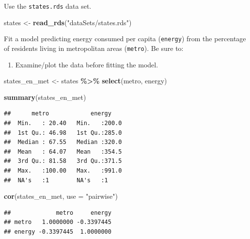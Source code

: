 \documentclass[
]{book}
\newenvironment{Shaded}{\begin{snugshade}}{\end{snugshade}}
\newcommand{\DataTypeTok}[1]{\textcolor[rgb]{0.13,0.29,0.53}{#1}}
\newcommand{\KeywordTok}[1]{\textcolor[rgb]{0.13,0.29,0.53}{\textbf{#1}}}
\newcommand{\NormalTok}[1]{#1}
\newcommand{\OperatorTok}[1]{\textcolor[rgb]{0.81,0.36,0.00}{\textbf{#1}}}
\newcommand{\StringTok}[1]{\textcolor[rgb]{0.31,0.60,0.02}{#1}}
\providecommand{\tightlist}{%
  \setlength{\itemsep}{0pt}\setlength{\parskip}{0pt}}
\begin{document}
\begin{alert}

Use the \texttt{states.rds} data set.

\begin{Shaded}
\begin{Highlighting}[]
\NormalTok{  states \textless{}{-}}\StringTok{ }\KeywordTok{read\_rds}\NormalTok{(}\StringTok{"dataSets/states.rds"}\NormalTok{)}
\end{Highlighting}
\end{Shaded}

Fit a model predicting energy consumed per capita (\texttt{energy}) from the percentage of residents living in metropolitan areas (\texttt{metro}). Be sure to:

\begin{enumerate}
\def\labelenumi{\arabic{enumi}.}
\tightlist
\item
  Examine/plot the data before fitting the model.
\end{enumerate}

\begin{Shaded}
\begin{Highlighting}[]
\NormalTok{  states\_en\_met \textless{}{-}}\StringTok{ }
\StringTok{      }\NormalTok{states }\OperatorTok{\%\textgreater{}\%}\StringTok{ }
\StringTok{      }\KeywordTok{select}\NormalTok{(metro, energy)}

  \KeywordTok{summary}\NormalTok{(states\_en\_met)}
\end{Highlighting}
\end{Shaded}

\begin{verbatim}
##      metro            energy     
##  Min.   : 20.40   Min.   :200.0  
##  1st Qu.: 46.98   1st Qu.:285.0  
##  Median : 67.55   Median :320.0  
##  Mean   : 64.07   Mean   :354.5  
##  3rd Qu.: 81.58   3rd Qu.:371.5  
##  Max.   :100.00   Max.   :991.0  
##  NA's   :1        NA's   :1
\end{verbatim}

\begin{Shaded}
\begin{Highlighting}[]
  \KeywordTok{cor}\NormalTok{(states\_en\_met, }\DataTypeTok{use =} \StringTok{"pairwise"}\NormalTok{)}
\end{Highlighting}
\end{Shaded}

\begin{verbatim}
##             metro     energy
## metro   1.0000000 -0.3397445
## energy -0.3397445  1.0000000
\end{verbatim}


\end{alert}
\end{document}
